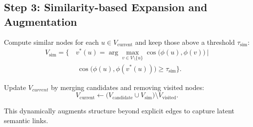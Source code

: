 \documentclass{article}
\theoremstyle{plain}
\theoremstyle{definition}
\theoremstyle{remark}
\begin{document}

\subsection{Step 3: Similarity-based Expansion and Augmentation}

Compute similar nodes for each $u\in V_{\text{current}}$ and keep those above a threshold $\tau_{\text{sim}}$:
\begin{equation}
\label{euqation4}
\begin{split}
V_{\text{sim}}=\Big\{\,&v^*(u)=\arg\max_{v\in V\setminus\{u\}}\cos\!\big(\phi(u),\phi(v)\big)\ \Big|\\
&\ \cos\!\big(\phi(u),\phi(v^*(u))\big)\ge \tau_{\text{sim}}\Big\}.
\end{split}
\end{equation}

Update $V_{current}$ by merging candidates and removing visited nodes:
$$
V_{\text{current}} \leftarrow \big( V_{\text{candidate}} \cup V_{\text{sim}} \big) \setminus V_{\text{visited}}.
$$

This dynamically augments structure beyond explicit edges to capture latent semantic links.

\end{document}
